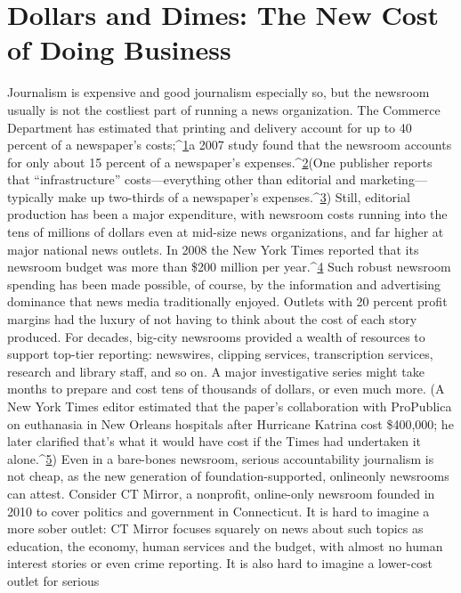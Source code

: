 \chapter{Dollars and Dimes: The New Cost of Doing Business}
Journalism is expensive and good journalism especially so, but the newsroom
usually is not the costliest part of running a news organization. The Commerce
Department has estimated that printing and delivery account for up to 40 percent
of a newspaper's costs;^{\href{#endnotes-chapter-7}{1}}a 2007 study found that the newsroom accounts for
only about 15 percent of a newspaper's expenses.^{\href{#endnotes-chapter-7}{2}}(One publisher reports that
``infrastructure'' costs—everything other than editorial and marketing—typically
make up two-thirds of a newspaper's expenses.^{\href{#endnotes-chapter-7}{3}}) Still, editorial production has
been a major expenditure, with newsroom costs running into the tens of millions
of dollars even at mid-size news organizations, and far higher at major national
news outlets. In 2008 the New York Times reported that its newsroom budget
was more than \$200 million per year.^{\href{#endnotes-chapter-7}{4}}
Such robust newsroom spending has been made possible, of course, by the
information and advertising dominance that news media traditionally enjoyed.
Outlets with 20 percent profit margins had the luxury of not having to think
about the cost of each story produced. For decades, big-city newsrooms provided
a wealth of resources to support top-tier reporting: newswires, clipping services,
transcription services, research and library staff, and so on. A major investigative
series might take months to prepare and cost tens of thousands of dollars, or even
much more. (A New York Times editor estimated that the paper's collaboration
with ProPublica on euthanasia in New Orleans hospitals after Hurricane Katrina
cost \$400,000; he later clarified that's what it would have cost if the Times had
undertaken it alone.^{\href{#endnotes-chapter-7}{5}}) Even in a bare-bones newsroom, serious accountability
journalism is not cheap, as the new generation of foundation-supported, onlineonly
newsrooms can attest.
Consider CT Mirror, a nonprofit, online-only newsroom founded in 2010 to
cover politics and government in Connecticut. It is hard to imagine a more sober
outlet: CT Mirror focuses squarely on news about such topics as education, the
economy, human services and the budget, with almost no human interest stories
or even crime reporting. It is also hard to imagine a lower-cost outlet for serious

